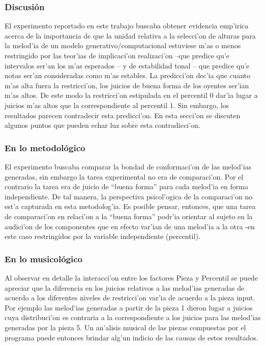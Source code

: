 \begin{imagen}
    \width{5cm}
\end{imagen}


\subsubsection{Discusi\'on}
El experimento reportado en este trabajo buscaba obtener evidencia emp'irica acerca de la importancia de que la unidad relativa a la selecci'on de alturas para la 
melod'ia de un modelo generativo/computacional estuviese m'as o menos restringido por las teor'ias de implicaci'on realizaci'on –que predice qu'e intervalos ser'an los m'as 
esperados – y de estabilidad tonal – que predice qu'e notas ser'an consideradas como m'as estables. La predicci'on dec'ia que cuanto m'as alta fuera la restricci'on, los 
juicios de buena forma de los oyentes ser'ian m'as altos. De este modo la restricci'on estipulada en el percentil 0 dar'ia lugar a juicios m'as altos que la correspondiente 
al percentil 1. Sin embargo, los resultados parecen contradecir esta predicci'on. En esta secci'on se discuten algunos puntos que pueden echar luz sobre esta contradicci'on. 

\subsubsection{En lo metodol\'ogico}
El experimento buscaba comparar la bondad de conformaci'on de las melod'ias generadas, sin embargo la tarea experimental no era de comparaci'on. Por el contrario la tarea 
era de juicio de ``buena forma'' para cada melod'ia en forma independiente. De tal manera, la perspectiva psicol'ogica de la comparaci'on no est'a capturada en esta 
metodolog'ia. Es posible pensar, entonces, que una tarea de comparaci'on en relaci'on a la “buena forma” podr'ia orientar al sujeto en la audici'on de los componentes 
que en efecto var'ian de una melod'ia a la otra -en este caso restringidos por la variable independiente (percentil).

\subsubsection{En lo musicol\'ogico}
Al observar en detalle la interacci'on entre los factores Pieza y Percentil se puede apreciar que la diferencia en los juicios relativos a las melod'ias generadas de 
acuerdo a los diferentes niveles de restricci'on var'ia de acuerdo a la pieza input. Por ejemplo las melod'ias generadas a partir de la pieza 1 dieron lugar a juicios 
cuya distribuci'on es contraria a la correspondiente a los juicios para las melod'ias generadas por la pieza 5. Un an'alisis musical de las piezas compuestas por el 
programa puede entonces brindar alg'un indicio de las causas de estos resultados.

